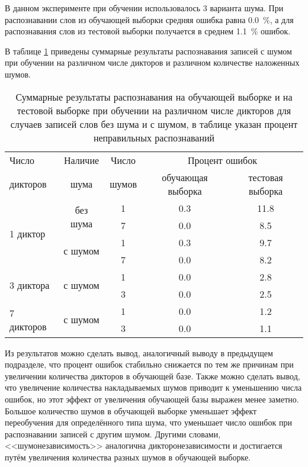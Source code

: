 В данном эксперименте при обучении использовалось 3 варианта шума.
При распознавании слов из обучающей выборки средняя ошибка равна 0.0~\%, а для распознавания слов из тестовой выборки получается в среднем 1.1~\% ошибок.

В таблице \ref{tab:cnn_with_noise_summary} приведены суммарные результаты распознавания записей с шумом при обучении на различном числе дикторов и различном количестве наложенных шумов.

\begin{table}[h]
	\centering
	\caption{Суммарные результаты распознавания на обучающей выборке и на тестовой выборке при обучении на различном числе дикторов для случаев записей слов без шума и с шумом, в таблице указан процент неправильных распознаваний}
	\label{tab:cnn_with_noise_summary}
	\begin{tabular}{| l | c | c | c | c |}
		\hline
		Число				& \phantom{0}Наличие\phantom{0} & \phantom{0} Число \phantom{0} 	& \multicolumn{2}{c|}{Процент ошибок}	\\
		\hhline{~~~--}
		дикторов			& шума  			& шумов 	& обучающая выборка & тестовая выборка	\\
		\hline
		\multirow{4}{*}{1 диктор}	& \multirow{2}{*}{без шума}	& 1				& 0.3 		& 11.8 		\\
		\hhline{~~---}
		&    						& 7				& 0.0 		& 8.5  		\\
		\hhline{~----}
		& \multirow{2}{*}{с шумом}	& 1				& 0.3 		& 9.7  		\\
		\hhline{~~---}
		&    						& 7				& 0.0 		& 8.2  		\\
		\hline
		\multirow{2}{*}{3 диктора}	& \multirow{2}{*}{с шумом}	& 1				& 0.0 		& 2.8  		\\
		\hhline{~~---}
		&    						& 3				& 0.0 		& 2.5  		\\
		\hline
		\multirow{2}{*}{7 дикторов}	& \multirow{2}{*}{с шумом}	& 1				& 0.0 		& 1.2  		\\
		\hhline{~~---}
		&    						& 3				& 0.0 		& 1.1  		\\
		\hline
	\end{tabular}
\end{table}

Из результатов можно сделать вывод, аналогичный выводу в предыдущем подразделе, что процент ошибок стабильно снижается по тем же причинам при увеличении количества дикторов в обучающей базе.
Также можно сделать вывод, что увеличение количества накладываемых шумов приводит к уменьшению числа ошибок, но этот эффект от увеличения обучающей базы выражен менее заметно.
Большое количество шумов в обучающей выборке уменьшает эффект переобучения для определённого типа шума, что уменьшает число ошибок при распознавании записей с другим шумом.
Другими словами, <<шумонезависимость>> аналогична дикторонезависимости и достигается путём увеличения количества разных шумов в обучающей выборке.

